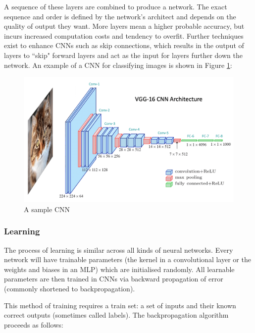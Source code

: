 A sequence of these layers are combined to produce a network. The exact sequence and order is defined by the network's architect and depends on the quality of output they want. More layers mean a higher probable accuracy, but incurs increased computation costs and tendency to overfit. Further techniques exist to enhance CNNs such as skip connections, which results in the output of layers to ``skip" forward layers and act as the input for layers further down the network. An example of a CNN for classifying images is shown in Figure \ref{fig:sample-cnn}:

\begin{figure}[H]
    \centering
    \includegraphics[width=0.5\linewidth]{dissertation//figures/sample-cnn.png}
    \caption{A sample CNN\cite{kromydas2023convolutional}}
    \label{fig:sample-cnn}
\end{figure}

\subsubsection{Learning}
\label{sec:learning}

The process of learning is similar across all kinds of neural networks. Every network will have trainable parameters (the kernel in a convolutional layer or the weights and biases in an MLP) which are initialised randomly. All learnable parameters are then trained in CNNs via backward propagation of error (commonly shortened to backpropagation)\cite{rojas2013neural}.

This method of training requires a train set: a set of inputs and their known correct outputs (sometimes called labels). The backpropagation algorithm proceeds as follows:

